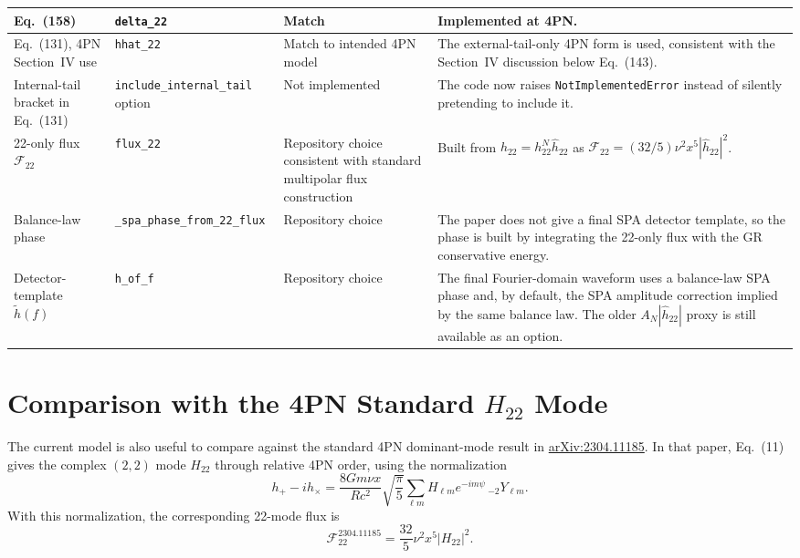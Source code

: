 \documentclass[11pt]{article}
\begin{document}
\begin{longtable}{|>{\raggedright\arraybackslash}p{}|>{\raggedright\arraybackslash}p{}|>{\raggedright\arraybackslash}p{}|>{\raggedright\arraybackslash}p{}|}
Eq.~(158) & \texttt{delta\_22} & Match & Implemented at 4PN. \\
\hline

Eq.~(131), 4PN Section~IV use & \texttt{hhat\_22} & Match to intended 4PN model & The external-tail-only 4PN form is used, consistent with the Section~IV discussion below Eq.~(143). \\
\hline

Internal-tail bracket in Eq.~(131) & \texttt{include\_internal\_tail} option & Not implemented & The code now raises \texttt{NotImplementedError} instead of silently pretending to include it. \\
\hline

22-only flux \(\mathcal F_{22}\) & \texttt{flux\_22} & Repository choice consistent with standard multipolar flux construction & Built from \(h_{22}=h_{22}^N \hat h_{22}\) as \(\mathcal F_{22}=(32/5)\nu^2 x^5 |\hat h_{22}|^2\). \\
\hline

Balance-law phase & \texttt{\_spa\_phase\_from\_22\_flux} & Repository choice & The paper does not give a final SPA detector template, so the phase is built by integrating the 22-only flux with the GR conservative energy. \\
\hline

Detector-template \(\tilde h(f)\) & \texttt{h\_of\_f} & Repository choice & The final Fourier-domain waveform uses a balance-law SPA phase and, by default, the SPA amplitude correction implied by the same balance law. The older \(A_N|\hat h_{22}|\) proxy is still available as an option. \\
\hline

\end{longtable}

\section{Comparison with the 4PN Standard \(H_{22}\) Mode}

The current model is also useful to compare against the standard 4PN
dominant-mode result in
\href{https://arxiv.org/abs/2304.11185}{arXiv:2304.11185}. In that paper,
Eq.~(11) gives the complex \((2,2)\) mode \(H_{22}\) through relative 4PN
order, using the normalization
\begin{equation}
  h_+ - i h_\times
  =
  \frac{8Gm\nu x}{Rc^2}\sqrt{\frac{\pi}{5}}
  \sum_{\ell m} H_{\ell m}e^{-im\psi}\,{}_{-2}Y_{\ell m}.
\end{equation}
With this normalization, the corresponding 22-mode flux is
\begin{equation}
  \mathcal F_{22}^{2304.11185}
  =
  \frac{32}{5}\nu^2x^5 |H_{22}|^2.
\end{equation}
\end{document}
